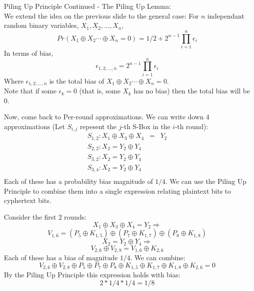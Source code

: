 \documentclass[9pt]{beamer}
\begin{document}
\begin{frame}
Piling Up Principle Continued - The Piling Up Lemma:\\
\vspace{5mm}
We extend the idea on the previous slide to the general case: For $n$ independant random binary variables, $X_1, X_2, \dots, X_n$, 
\[ Pr(X_1 \oplus X_2 \cdots \oplus X_n = 0) = 1/2 + 2^{n-1} \prod_{i=1}^n \epsilon_i \]
In terms of bias,
\[ \epsilon_{1,2,\dots,n} = 2^{n-1} \prod_{i = 1}^n \epsilon_i \]
Where $\epsilon_{1,2,\dots,n}$ is the total bias of $X_1 \oplus X_2 \cdots \oplus X_n = 0$. \\
\vspace{5mm}
Note that if some $\epsilon_k = 0$ (that is, some $X_k$ has no bias) then the total bias will be $0$.  
\end{frame}

\begin{frame}
Now, come back to Per-round approximations. We can write down 4 approximations (Let $S_{i,j}$ repesent the $j$-th S-Box in the $i$-th round):
\begin{eqnarray*}
S_{1,2}: X_1 \oplus X_3 \oplus X_4 & = & Y_2 \\
S_{2,2}: X_2 = Y_2 \oplus Y_4 \\
S_{3,2}: X_2 = Y_2 \oplus Y_4 \\
S_{3,4}: X_2 = Y_2 \oplus Y_4 \\
\end{eqnarray*}
Each of these has a probability bias magnitude of $1/4$. We can use the Piling Up Principle to combine them into a single expression relating plaintext bits to cyphertext bits.
\end{frame}

\begin{frame}
Consider the first 2 rounds:\\
\vspace{5mm}
\[  X_1 \oplus X_3 \oplus X_4 = Y_2 \Rightarrow \]
\[ V_{1,6} = (P_5\oplus K_{1,5}) \oplus (P_7\oplus K_{1,7}) \oplus (P_8\oplus K_{1,8}) \]
\vspace{2mm}
\[ X_2 = Y_2 \oplus Y_4 \Rightarrow \]
\[ V_{2,6} \oplus V_{2,8} = V_{1,6} \oplus K_{2,6} \]
\vspace{2mm}
Each of these has a bias of magnitude $1/4$. We can combine:
\[  V_{2,6} \oplus V_{2,8} \oplus P_5 \oplus P_7 \oplus P_8 \oplus K_{1,5} \oplus K_{1,7} \oplus K_{1,8} \oplus K_{2,6} = 0 \]
By the Piling Up Principle this expression holds with bias:
\[ 2 * 1/4 * 1/4 = 1/8 \]
\end{frame}
\end{document}
